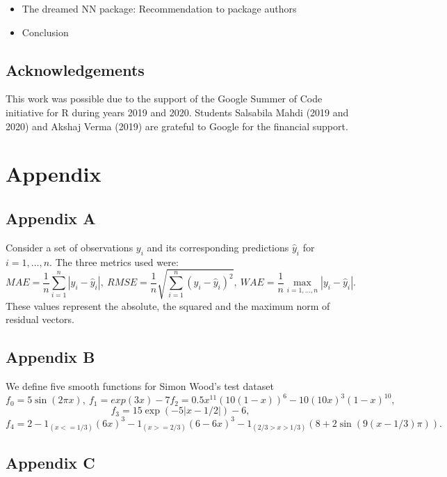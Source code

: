 \begin{itemize}
\tightlist
\item
  The dreamed NN package: Recommendation to package authors
\item
  Conclusion
\end{itemize}

\hypertarget{acknowledgements}{%
\subsection{Acknowledgements}\label{acknowledgements}}

This work was possible due to the support of the Google Summer of Code
initiative for R during years 2019 and 2020. Students Salsabila Mahdi
(2019 and 2020) and Akshaj Verma (2019) are grateful to Google for the
financial support.



\hypertarget{appendix}{%
\section{Appendix}\label{appendix}}

\hypertarget{appendix-a}{%
\subsection{Appendix A}\label{appendix-a}}

Consider a set of observations \(y_i\) and its corresponding predictions
\(\hat y_i\) for \(i=1,\dots,n\). The three metrics used were: \[
MAE = \frac1n\sum_{i=1}^n|y_i - \hat y_i|,~
RMSE = \frac1n\sqrt{\sum_{i=1}^n(y_i - \hat y_i)^2},~
WAE = \frac1n\max_{i=1,\dots,n}|y_i - \hat y_i|.
\] These values represent the absolute, the squared and the maximum norm
of residual vectors.

\hypertarget{appendix-b}{%
\subsection{Appendix B}\label{appendix-b}}

We define five smooth functions for Simon Wood's test dataset \[
f_0=5\sin(2\pi x),~
f_1=exp(3x)-7
f_2=0.5 x^{11}(10(1 - x))^6 - 10 (10x)^3(1 - x)^{10},~
\] \[
f_3=15 \exp(-5 |x-1/2|)-6,
\] \[
f_4=2-1_{(x <= 1/3)}(6x)^3 - 1_{(x >= 2/3)} (6-6x)^3 - 
1_{(2/3 > x > 1/3)}(8+2\sin(9(x-1/3)\pi)).
\]

\hypertarget{appendix-c}{%
\subsection{Appendix C}\label{appendix-c}}

